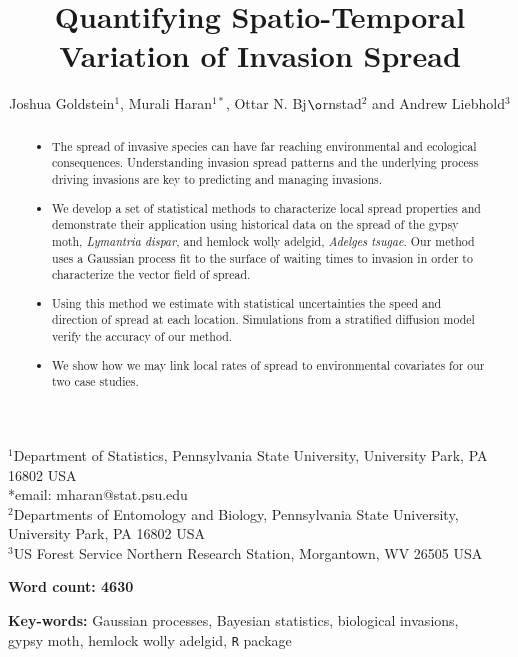\documentclass[12pt]{article}
\title{Quantifying Spatio-Temporal Variation of Invasion Spread}
\author{Joshua Goldstein$^1$, Murali Haran$^{1*}$, Ottar N. Bj$\o$rnstad$^2$ and Andrew Liebhold$^3$}
\date{}
\begin{document}
\linenumbers
\doublespacing
\label{firstpage}

\maketitle

\noindent$^1$Department of Statistics, Pennsylvania State University, University Park, PA 16802 USA\\
{*}email: mharan@stat.psu.edu\\
$^2$Departments of Entomology and Biology, Pennsylvania State University, University Park, PA 16802 USA\\
$^3$US Forest Service Northern Research Station, Morgantown, WV 26505 USA

\begin{center} {\bf Word count: 4630} \end{center}

\clearpage

\begin{abstract}\noindent
\begin{itemize}
\item The spread of invasive species can have far reaching environmental and ecological consequences. Understanding invasion spread patterns and the underlying process driving invasions are key to predicting and managing invasions.
\item We develop a set of statistical methods to characterize local spread properties and demonstrate their application using historical data on the spread of the gypsy moth, {\it Lymantria dispar}, and hemlock wolly adelgid, {\it Adelges tsugae}. Our method uses a Gaussian process fit to the surface of waiting times to invasion in order to characterize the vector field of spread.
\item Using this method we estimate with statistical uncertainties the speed and direction of spread at each location. Simulations from a stratified diffusion model verify the accuracy of our method.
\item We show how we may link local rates of spread to environmental covariates for our two case studies.
\end{itemize}
\end{abstract}

\begin{center}{\bf Key-words:} Gaussian processes, Bayesian statistics, biological invasions,\\ gypsy moth, hemlock wolly adelgid, \texttt{R} package \end{center}
\end{document}
